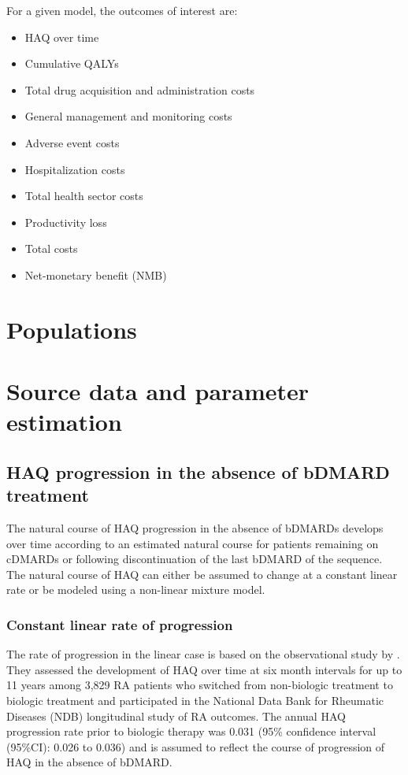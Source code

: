 \documentclass[11pt,final,fleqn]{article}\usepackage[]{graphicx}\usepackage[]{color}
\theoremstyle{plain}
\begin{document}
For a given model, the outcomes of interest are:

\begin{itemize}
\item HAQ over time
\item Cumulative QALYs
\item Total drug acquisition and administration costs
\item General management and monitoring costs
\item Adverse event costs
\item Hospitalization costs
\item Total health sector costs
\item Productivity loss
\item Total costs
\item Net-monetary benefit (NMB)
\end{itemize}

\section{Populations}\label{sec:populations}

\section{Source data and parameter estimation}\label{sec:data-parameters}

\subsection{HAQ progression in the absence of bDMARD
treatment}\label{haq-progression-in-the-absence-of-bdmard-treatment}

The natural course of HAQ progression in the absence of bDMARDs develops over time according to an estimated natural course for patients remaining on cDMARDs or following discontinuation of the last bDMARD of the sequence. The natural course of HAQ can either be assumed to change at a constant linear rate or be modeled using a non-linear mixture model. 

\subsubsection{Constant linear rate of progression} \label{sec:haq-linear-rate}
The rate of progression in the linear case is based on the observational study by \citet{wolfe2010loss}. They assessed the development of HAQ over time at six month intervals for up to 11 years among 3,829 RA patients who switched from non-biologic treatment to biologic treatment and participated in the National Data Bank for Rheumatic Diseases (NDB) longitudinal study of RA outcomes. The annual HAQ progression rate prior to biologic therapy was 0.031 (95\% confidence interval (95\%CI): 0.026 to 0.036) and is assumed to reflect the course of progression of HAQ in the absence of bDMARD.
\end{document}
